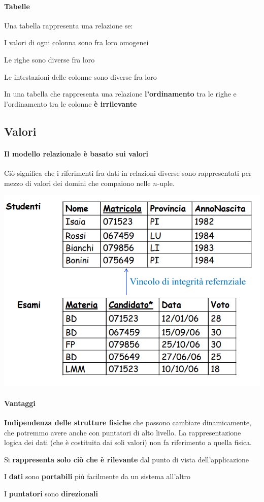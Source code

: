\documentclass[10pt]{book}
\begin{document}
\paragraph{Tabelle} Una tabella rappresenta una relazione se:
\begin{list}{}{}
	\item I valori di ogni colonna sono fra loro omogenei
	\item Le righe sono diverse fra loro
	\item Le intestazioni delle colonne sono diverse fra loro
\end{list}
In una tabella che rappresenta una relazione \textbf{l'ordinamento} tra le righe e l'ordinamento tra le colonne \textbf{è irrilevante}
\pagebreak
\subsection{Valori}
\paragraph{Il modello relazionale è basato sui valori} Ciò significa che i riferimenti fra dati in relazioni diverse sono rappresentati per mezzo di valori dei domini che compaiono nelle $n$-uple.
\begin{center}
	\includegraphics[scale=0.5]{integ.png}
\end{center}
\paragraph{Vantaggi}
\begin{list}{}{}
	\item \textbf{Indipendenza delle strutture fisiche} che possono cambiare dinamicamente, che potremmo avere anche con puntatori di alto livello. La rappresentazione logica dei dati (che è costituita dai soli valori) non fa riferimento a quella fisica.
	\item Si \textbf{rappresenta solo ciò che è rilevante} dal punto di vista dell'applicazione
	\item I \textbf{dati} sono \textbf{portabili} più facilmente da un sistema all'altro
	\item I \textbf{puntatori} sono \textbf{direzionali}
\end{list}
\end{document}
